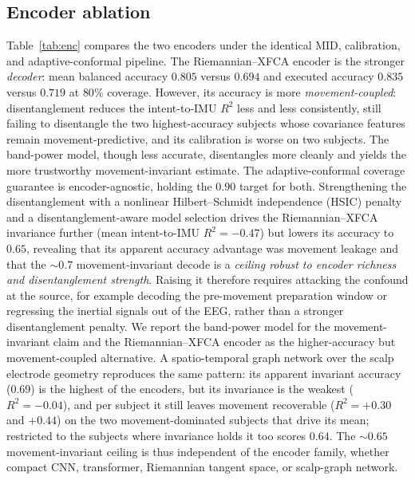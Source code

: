 \documentclass[conference]{IEEEtran}
\begin{document}
\subsection{Encoder ablation}\label{sec:ablation}
Table~\ref{tab:enc} compares the two encoders under the identical MID, calibration,
and adaptive-conformal pipeline. The Riemannian--XFCA encoder is the stronger
\emph{decoder}: mean balanced accuracy $0.805$ versus $0.694$ and executed accuracy
$0.835$ versus $0.719$ at $80\%$ coverage. However, its accuracy is more
\emph{movement-coupled}: disentanglement reduces the intent-to-IMU $R^2$ less and
less consistently, still failing to disentangle the two highest-accuracy subjects
whose covariance features remain movement-predictive, and its calibration is worse on
two subjects. The band-power model, though less accurate, disentangles more cleanly
and yields the more trustworthy movement-invariant estimate. The adaptive-conformal
coverage guarantee is encoder-agnostic, holding the $0.90$ target for both.
Strengthening the disentanglement with a nonlinear Hilbert--Schmidt independence
(HSIC) penalty and a disentanglement-aware model selection drives the
Riemannian--XFCA invariance further (mean intent-to-IMU $R^2=-0.47$) but lowers its
accuracy to $0.65$, revealing that its apparent accuracy advantage was movement
leakage and that the ${\sim}0.7$ movement-invariant decode is a \emph{ceiling robust
to encoder richness and disentanglement strength}. Raising it therefore requires
attacking the confound at the source, for example decoding the pre-movement
preparation window or regressing the inertial signals out of the EEG, rather than a
stronger disentanglement penalty. We report the band-power model for the
movement-invariant claim and the Riemannian--XFCA encoder as the higher-accuracy but
movement-coupled alternative. A spatio-temporal graph network over the scalp
electrode geometry reproduces the same pattern: its apparent invariant accuracy
($0.69$) is the highest of the encoders, but its invariance is the weakest
($R^2=-0.04$), and per subject it still leaves movement recoverable ($R^2=+0.30$
and $+0.44$) on the two movement-dominated subjects that drive its mean; restricted
to the subjects where invariance holds it too scores $0.64$. The ${\sim}0.65$
movement-invariant ceiling is thus independent of the encoder family, whether compact
CNN, transformer, Riemannian tangent space, or scalp-graph network.
\end{document}
